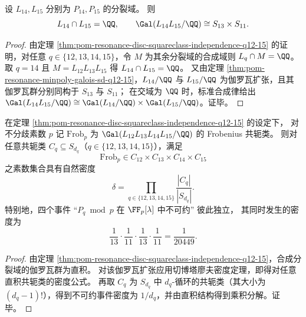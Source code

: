 \begin{corollary}[两条碰撞矩谱域的线性互斥与直积伽罗瓦群（\texorpdfstring{$q=14,15$}{q=14,15}）]\label{cor:pom-resonance-linear-disjointness-q14-15}
设 \(L_{14},L_{15}\) 分别为 \(P_{14},P_{15}\) 的分裂域。
则
\[
L_{14}\cap L_{15}=\QQ,
\qquad
\Gal(L_{14}L_{15}/\QQ)\cong S_{13}\times S_{11}.
\]
\end{corollary}
\begin{proof}
由定理 \ref{thm:pom-resonance-disc-squareclass-independence-q12-15} 的证明，对任意 \(q\in\{12,13,14,15\}\)，令 \(M\) 为其余分裂域的合成域则 \(L_q\cap M=\QQ\)。
取 \(q=14\) 且 \(M=L_{12}L_{13}L_{15}\) 得 \(L_{14}\cap L_{15}=\QQ\)。
又由定理 \ref{thm:pom-resonance-minpoly-galois-sd-q12-15}，\(L_{14}/\QQ\) 与 \(L_{15}/\QQ\) 为伽罗瓦扩张，且其伽罗瓦群分别同构于 \(S_{13}\) 与 \(S_{11}\)；
在交域为 \(\QQ\) 时，标准合成律给出 \(\Gal(L_{14}L_{15}/\QQ)\cong \Gal(L_{14}/\QQ)\times\Gal(L_{15}/\QQ)\)。证毕。
\end{proof}

\begin{corollary}[四多项式分解型的切博塔廖夫完全独立律与显式密度]\label{cor:pom-resonance-chebotarev-product-density-q12-15}
在定理 \ref{thm:pom-resonance-disc-squareclass-independence-q12-15} 的设定下，
对不分歧素数 \(p\) 记 \(\mathrm{Frob}_p\) 为 \(\Gal(L_{12}L_{13}L_{14}L_{15}/\QQ)\) 的 Frobenius 共轭类。
则对任意共轭类 \(C_q\subseteq S_{d_q}\)（\(q\in\{12,13,14,15\}\)），满足
\[
\mathrm{Frob}_p\in C_{12}\times C_{13}\times C_{14}\times C_{15}
\]
之素数集合具有自然密度
\[
\delta=\prod_{q\in\{12,13,14,15\}}\frac{|C_q|}{|S_{d_q}|}.
\]
特别地，四个事件 ``\(P_q\bmod p\) 在 \(\FF_p[\lambda]\) 中不可约'' 彼此独立，
其同时发生的密度为
\[
\frac1{13}\cdot\frac1{11}\cdot\frac1{13}\cdot\frac1{11}=\frac1{20449}.
\]
\end{corollary}
\begin{proof}
由定理 \ref{thm:pom-resonance-disc-squareclass-independence-q12-15}，合成分裂域的伽罗瓦群为直积。
对该伽罗瓦扩张应用切博塔廖夫密度定理，即得对任意直积共轭类的密度公式。
再取 \(C_q\) 为 \(S_{d_q}\) 中 \(d_q\)-循环的共轭类（其大小为 \((d_q-1)!\)），得到不可约事件密度为 \(1/d_q\)，并由直积结构得到乘积分解。证毕。
\end{proof}

